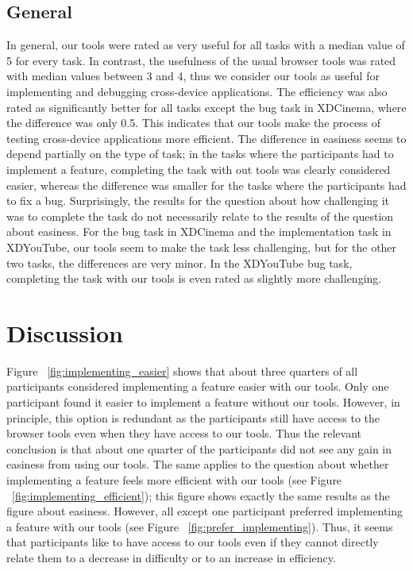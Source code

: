 \subsection{General}

In general, our tools were rated as very useful for all tasks with a median value of 5 for every task. In contrast, the usefulness of the usual browser tools was rated with median values between 3 and 4, thus we consider our tools as useful for implementing and debugging cross-device applications. The efficiency was also rated as significantly better for all tasks except the bug task in XDCinema, where the difference was only 0.5. This indicates that our tools make the process of testing cross-device applications more efficient. The difference in easiness seems to depend partially on the type of task; in the tasks where the participants had to implement a feature, completing the task with out tools was clearly considered easier, whereas the difference was smaller for the tasks where the participants had to fix a bug. Surprisingly, the results for the question about how challenging it was to complete the task do not necessarily relate to the results of the question about easiness. For the bug task in XDCinema and the implementation task in XDYouTube, our tools seem to make the task less challenging, but for the other two tasks, the differences are very minor. In the XDYouTube bug task, completing the task with our tools is even rated as slightly more challenging.

\section{Discussion}

Figure ~\ref{fig:implementing_easier} shows that about three quarters of all participants considered implementing a feature easier with our tools. Only one participant found it easier to implement a feature without our tools. However, in principle, this option is redundant as the participants still have access to the browser tools even when they have access to our tools. Thus the relevant conclusion is that about one quarter of the participants did not see any gain in easiness from using our tools. The same applies to the question about whether implementing a feature feels more efficient with our tools (see Figure ~\ref{fig:implementing_efficient}); this figure shows exactly the same results as the figure about easiness. However, all except one participant preferred implementing a feature with our tools (see Figure ~\ref{fig:prefer_implementing}). Thus, it seems that participants like to have access to our tools even if they cannot directly relate them to a decrease in difficulty or to an increase in efficiency.

